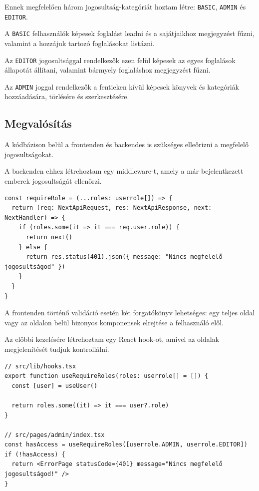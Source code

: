Ennek megfelelően három jogosultság-kategóriát hoztam létre: \lstinline|BASIC|, \lstinline|ADMIN| és \lstinline|EDITOR|.

A \lstinline|BASIC| felhasználók képesek foglalást leadni és a sajátjaikhoz megjegyzést fűzni, valamint a hozzájuk tartozó foglalásokat listázni.

Az \lstinline|EDITOR| jogosultsággal rendelkezők ezen felül képesek az egyes foglalások állapotát állítani, valamint bármyely foglaláshoz
megjegyzést fűzni.

Az \lstinline|ADMIN| joggal rendelkezők a fentieken kívül képesek könyvek és kategóriák hozzáadására, törlésére és szerkesztésére.

\subsection{Megvalósítás}

A kódbázison belül a frontenden és backendes is szükséges elleőrizni a megfelelő jogosultságokat.

A backenden ehhez létrehoztam egy middleware-t, amely a már bejelentkezett emberek jogosultságát ellenőrzi.
\begin{lstlisting}[caption=Authorizáció middleware]
const requireRole = (...roles: userrole[]) => {
  return (req: NextApiRequest, res: NextApiResponse, next: NextHandler) => {
    if (roles.some(it => it === req.user.role)) {
      return next()
    } else {
      return res.status(401).json({ message: "Nincs megfelelő jogosultságod" })
    }
  }
}
\end{lstlisting}

A frontenden történő validáció esetén két forgatókönyv lehetséges: egy teljes oldal vagy az oldalon belül bizonyos komponensek
elrejtése a felhasználó elől.

Az előbbi kezelésére létrehoztam egy React hook-ot, amivel az oldalak megjelenítését tudjuk kontrollálni.

\begin{lstlisting}[caption=Authorizációs hook és használata]
// src/lib/hooks.tsx
export function useRequireRoles(roles: userrole[] = []) {
  const [user] = useUser()

  return roles.some((it) => it === user?.role)
}

// src/pages/admin/index.tsx
const hasAccess = useRequireRoles([userrole.ADMIN, userrole.EDITOR])
if (!hasAccess) {
  return <ErrorPage statusCode={401} message="Nincs megfelelő jogosultságod!" />
}
\end{lstlisting}

